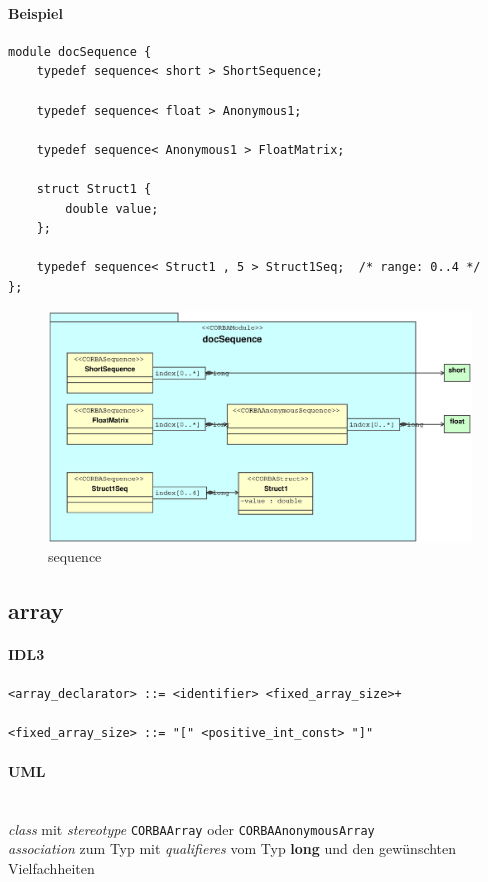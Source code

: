\documentclass [a4paper,10pt] {scrartcl}
\begin{document}
\paragraph{Beispiel}
\begin{verbatim}
module docSequence {
    typedef sequence< short > ShortSequence;

    typedef sequence< float > Anonymous1;

    typedef sequence< Anonymous1 > FloatMatrix;

    struct Struct1 {
        double value;
    };

    typedef sequence< Struct1 , 5 > Struct1Seq;  /* range: 0..4 */
};
\end{verbatim}
\begin{figure}[!h]
\centerline{\includegraphics[width=1.2\linewidth]{docSequence.eps}}
\caption{sequence}
\label{fig:sequence}
\end{figure}

\cleardoublepage
\subsection{array}
\paragraph{IDL3}
\begin{verbatim}
<array_declarator> ::= <identifier> <fixed_array_size>+

<fixed_array_size> ::= "[" <positive_int_const> "]"
\end{verbatim}
\paragraph{UML}~\\
\emph{class} mit \emph{stereotype} \texttt{CORBAArray} oder \texttt{CORBAAnonymousArray}\\
\emph{association} zum Typ mit \emph{qualifieres} vom Typ \textbf{long}
und den gew{\"u}nschten Vielfachheiten\\
\end{document}
